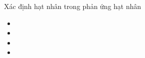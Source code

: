 \begin{dang}{Xác định hạt nhân trong phản ứng hạt nhân}
\begin{itemize}
	\item 
	\item 
	\item 
	\item
\end{itemize}

\end{dang}
